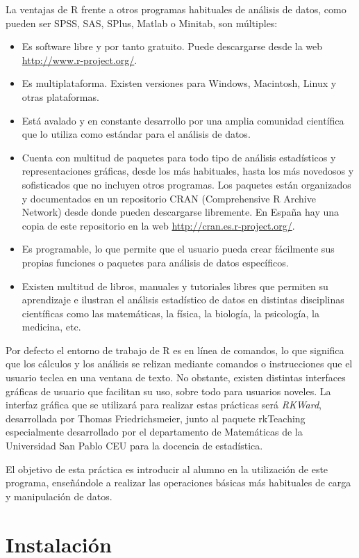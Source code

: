 La ventajas de R frente a otros programas habituales de análisis de datos, como pueden ser SPSS, SAS, SPlus, Matlab o
Minitab, son múltiples:
\begin{itemize}
\item Es software libre y por tanto gratuito. Puede descargarse desde la web 
\url{http://www.r-project.org/}.
\item Es multiplataforma. Existen versiones para Windows, Macintosh, Linux y otras plataformas.
\item Está avalado y en constante desarrollo por una amplia comunidad científica que lo utiliza como estándar para el
análisis de datos.
\item Cuenta con multitud de paquetes para todo tipo de análisis estadísticos y representaciones gráficas, desde los más
habituales, hasta los más novedosos y sofisticados que no incluyen otros programas. Los paquetes están organizados y
documentados en un repositorio CRAN (Comprehensive R Archive Network) desde donde pueden descargarse libremente. En
España hay una copia de este repositorio en la web \url{http://cran.es.r-project.org/}.
\item Es programable, lo que permite que el usuario pueda crear fácilmente sus propias funciones o paquetes para
análisis de datos específicos.
\item Existen multitud de libros, manuales y tutoriales libres que permiten su aprendizaje e ilustran el análisis
estadístico de datos en distintas disciplinas científicas como las matemáticas, la física, la biología, la psicología, la medicina,
etc.
\end{itemize}

Por defecto el entorno de trabajo de R es en línea de comandos, lo que significa que los cálculos y los análisis se
relizan mediante comandos o instrucciones que el usuario teclea en una ventana de texto. No obstante, existen distintas
interfaces gráficas de usuario que facilitan su uso, sobre todo para usuarios noveles.
La interfaz gráfica que se utilizará para realizar estas prácticas será \emph{RKWard}, desarrollada por Thomas
Friedrichsmeier, junto al paquete rkTeaching especialmente desarrollado por el departamento de Matemáticas de la
Universidad San Pablo CEU para la docencia de estadística.

El objetivo de esta práctica es introducir al alumno en la utilización de este programa, enseñándole a realizar las
operaciones básicas más habituales de carga y manipulación de datos.

\section{Instalación}
